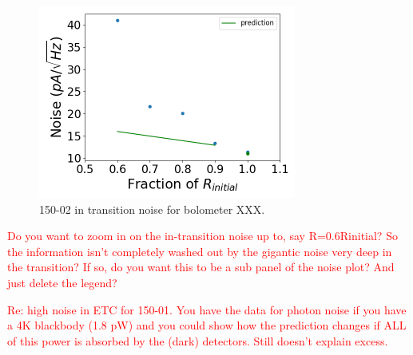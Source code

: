 \begin{figure}[ht!]
\begin{center}
\includegraphics[height=2.5in]{figures/150-02_b53w0c0_it_noise.png}
\caption{150-02 in transition noise for bolometer XXX. 
\label{fig:150-02_it_noise} }
\end{center}
\end{figure}


\textcolor{red}{Do you want to zoom in on the in-transition noise up to, say R=0.6Rinitial? So the information isn't completely washed out by the gigantic noise very deep in the transition? If so, do you want this to be a sub panel of the noise plot? And just delete the legend?}

\textcolor{red}{Re: high noise in ETC for 150-01. You have the data for photon noise if you have a 4K blackbody (1.8 pW) and you could show how the prediction changes if ALL of this power is absorbed by the (dark) detectors. Still doesn't explain excess.}






